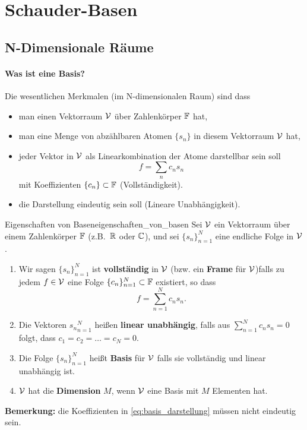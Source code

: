 \section{Schauder-Basen}

\subsection{N-Dimensionale Räume}

\paragraph{Was ist eine Basis?} Die wesentlichen Merkmalen (im N-dimensionalen Raum) sind dass
\begin{itemize}
  \item man einen Vektorraum $\mathcal{V}$ über Zahlenkörper $\mathbb{F}$ hat,
  \item man eine Menge von abzählbaren Atomen $\{s_n\}$ in diesem Vektorraum $\mathcal{V}$ hat,
  \item jeder Vektor in $\mathcal{V}$ als Linearkombination der Atome darstellbar sein soll
  \begin{equation*}
    f = \sum_n c_n s_n
  \end{equation*}
  mit Koeffizienten $\{c_n\} \subset \mathbb{F}$ (Vollständigkeit).
  \item die Darstellung eindeutig sein soll (Lineare Unabhängigkeit).
\end{itemize}

\begin{boringDef}{Eigenschaften von Basen}{eigenschaften_von_basen}
  Sei $\mathcal{V}$ ein Vektorraum über einem Zahlenkörper $\mathbb{F}$ (z.B.\ $\mathbb{R}$ oder $\mathbb{C}$), und sei
  $\{s_n\}_{n=1}^N$ eine endliche Folge in $\mathcal{V}$.
  \begin{enumerate}
    \item Wir sagen $\{s_n\}_{n=1}^N$ ist \textbf{vollständig} in $\mathcal{V}$ (bzw. ein \textbf{Frame} für $\mathcal{V}$)falls zu jedem $f \in \mathcal{V}$ eine Folge $\{c_n\}_{n=1}^N \subset \mathbb{F}$ existiert, so dass
    \begin{equation}
      f = \sum\limits_{n=1}^{N} c_n s_n.\label{eq:basis_darstellung}
    \end{equation}
    \item Die Vektoren ${s_n}_{n=1}^{N}$ heißen \textbf{linear unabhängig}, falls aus $\sum\limits_{n=1}^{N} c_{n} s_n = 0$ folgt, dass $c_1 = c_2 = \dots = c_N = 0$.
    \item Die Folge $\{s_n\}_{n=1}^N$ heißt \textbf{Basis} für $\mathcal{V}$ falls sie vollständig und linear unabhängig ist.
    \item $\mathcal{V}$ hat die \textbf{Dimension} $M$, wenn $\mathcal{V}$ eine Basis mit $M$ Elementen hat.
  \end{enumerate}
  \textbf{Bemerkung:} die Koeffizienten in \eqref{eq:basis_darstellung} müssen nicht eindeutig sein.
\end{boringDef}

